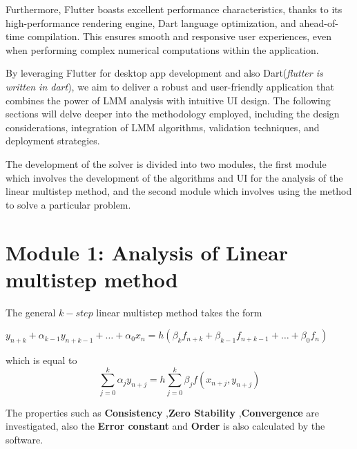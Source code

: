 Furthermore, Flutter boasts excellent performance characteristics, thanks to its high-performance rendering engine, Dart language optimization, and ahead-of-time compilation. This ensures smooth and responsive user experiences, even when performing complex numerical computations within the application.

By leveraging Flutter for desktop app development and also Dart(\textit{flutter is written in dart}), we aim to deliver a robust and user-friendly application that combines the power of LMM analysis with intuitive UI design. The following sections will delve deeper into the methodology employed, including the design considerations, integration of LMM algorithms, validation techniques, and deployment strategies.



The development of the solver is divided into two modules, the first module which involves the development of the algorithms and UI for the analysis of the linear multistep method, and the second module which involves using the method to solve a particular problem. 



\section{Module 1: Analysis of Linear multistep method}
The general $k-step$ linear multistep method takes the form 


\begin{math}
   y_{n+k} + \alpha_{k-1}y_{n+k-1}+ \dots + \alpha_0x_n = h(\beta_kf_{n+k}+ \beta_{k-1}f_{n+k-1}+ \dots + \beta_0f_n) 
\end{math}

which is equal to 
\begin{equation}
   \sum_{j=0}^{k} \alpha_j y_{n+j} = h \sum_{j=0}^{k} \beta_j f(x_{n+j}, y_{n+j})
\end{equation} \cite{2022JFatokunEtAl}

The properties such as \textbf{Consistency} ,\textbf{Zero Stability} ,\textbf{Convergence} are investigated, also the \textbf{Error constant} and \textbf{Order} is also calculated by the software.

